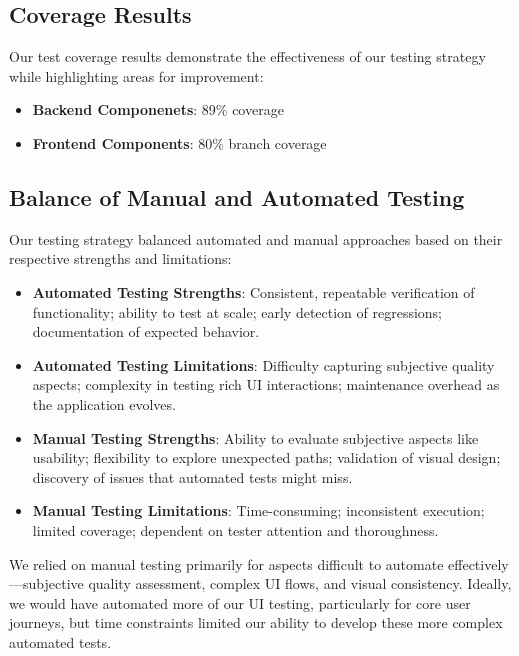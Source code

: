 \subsection{Coverage Results}

Our test coverage results demonstrate the effectiveness of our testing strategy while highlighting areas for improvement:
 
\begin{itemize}
    \item \textbf{Backend Componenets}: 89\% coverage
    \item \textbf{Frontend Components}: 80\% branch coverage
\end{itemize}

\subsection{Balance of Manual and Automated Testing}

Our testing strategy balanced automated and manual approaches based on their respective strengths and limitations:

\begin{itemize}
    \item \textbf{Automated Testing Strengths}: Consistent, repeatable verification of functionality; ability to test at scale; early detection of regressions; documentation of expected behavior.
    
    \item \textbf{Automated Testing Limitations}: Difficulty capturing subjective quality aspects; complexity in testing rich UI interactions; maintenance overhead as the application evolves.
    
    \item \textbf{Manual Testing Strengths}: Ability to evaluate subjective aspects like usability; flexibility to explore unexpected paths; validation of visual design; discovery of issues that automated tests might miss.
    
    \item \textbf{Manual Testing Limitations}: Time-consuming; inconsistent execution; limited coverage; dependent on tester attention and thoroughness.
\end{itemize}

We relied on manual testing primarily for aspects difficult to automate effectively—subjective quality assessment, complex UI flows, and visual consistency. Ideally, we would have automated more of our UI testing, particularly for core user journeys, but time constraints limited our ability to develop these more complex automated tests.

